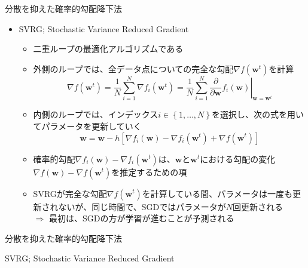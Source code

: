 \documentclass[dvipdfmx,notheorems,t]{beamer}
\begin{document}
\begin{frame}{分散を抑えた確率的勾配降下法}

\begin{itemize}
	\item SVRG; Stochastic Variance Reduced Gradient
	\begin{itemize}
		\item 二重ループの最適化アルゴリズムである
		\item 外側のループでは、全データ点についての完全な勾配$\nabla f(\bm{w}^t)$を計算
		\begin{equation}
			\nabla f(\bm{w}^t) = \frac{1}{N} \sum_{i = 1}^N \nabla f_i(\bm{w}^t) = \frac{1}{N} \sum_{i = 1}^N \left. \frac{\partial}{\partial \bm{w}} f_i(\bm{w}) \right|_{\bm{w} = \bm{w}^t}
		\end{equation}
		
		\item 内側のループでは、インデックス$i \in \left\{ 1, \ldots, N \right\}$を選択し、次の式を用いてパラメータを更新していく
		\begin{equation}
			\bm{w} = \bm{w} - h \left[ \nabla f_i(\bm{w}) - \nabla f_i(\bm{w}^t) + \nabla f(\bm{w}^t) \right]
		\end{equation}
		
		\item 確率的勾配$\nabla f_i(\bm{w}) - \nabla f_i(\bm{w}^t)$は、$\bm{w}$と$\bm{w}^t$における勾配の変化$\nabla f(\bm{w}) - \nabla f(\bm{w}^t)$を\alert{推定するための項}
		\newline
		
		\item SVRGが完全な勾配$\nabla f(\bm{w}^t)$を計算している間、パラメータは一度も更新されないが、同じ時間で、SGDではパラメータが$N$回更新される \\
		$\Rightarrow$ 最初は、SGDの方が学習が進むことが予測される
	\end{itemize}
\end{itemize}

\end{frame}

\begin{frame}{分散を抑えた確率的勾配降下法}

\begin{algorithm}[H]
	\DontPrintSemicolon
	\caption{SVRG; Stochastic Variance Reduced Gradient~\cite{stochastic_2017}}
	\label{alg:svrg}
	\begin{algorithmic}[1]
			 
				 
			\ENDFOR
		\ENDFOR
	\end{algorithmic}
\end{algorithm}

\end{frame}
\end{document}
